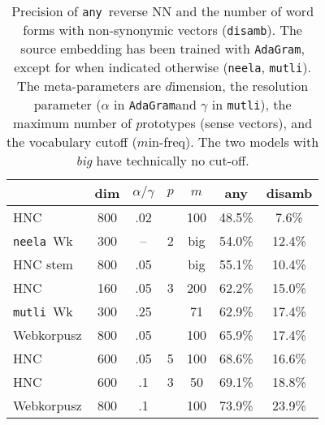 \documentclass[11pt]{article}
\newcommand{\neelakantan}{\texttt{neela}}
\newcommand{\adagram}{\texttt{AdaGram}}
\newcommand{\mutli}{\texttt{mutli}}
\newcommand{\any}{\texttt{any}}
\newcommand{\disamb}{\texttt{disamb}}
\begin{document}
\begin{table}
  \centering\small
    \begin{tabular}{lcccc|cc}
      \toprule
        & dim & $\alpha/\gamma$ & $p$ & $m$ & any & disamb \\
      \midrule
      HNC	        & 800	& .02	&       & 100   & 48.5\%	&  7.6\% \\
      \neelakantan~Wk&300&--&2   &big  & 54.0\%	&  12.4\% \\
      HNC stem & 800	& .05	&       &  big & 55.1\%	&  10.4\% \\
      HNC         & 160 & .05 & 3     & 200   & 62.2\%	&  15.0\% \\
      \mutli~Wk &300&.25 &       & 71    & 62.9\%	&  17.4\% \\
      Webkorpusz	    & 800	& .05	&       & 100	  & 65.9\%	&  17.4\% \\
      HNC	        & 600	& .05	& 5     & 100	  & 68.6\%	&  16.6\% \\
      HNC	        & 600	& .1  & 3     & 50	  & 69.1\%	&  18.8\% \\
      Webkorpusz	    & 800	& .1  &       & 100	  & 73.9\%	&  23.9\% \\
      \bottomrule
    \end{tabular}
  \caption{Precision of \any~reverse NN and the number of word forms with
  non-synonymic vectors (\disamb).  The source embedding has been trained with
  \adagram, except for when indicated otherwise (\neelakantan, \mutli).  The
  meta-parameters are $d$imension, the resolution parameter ($\alpha$ in
  \adagram and $\gamma$ in \mutli), the maximum number of $p$rototypes (sense
  vectors), and the vocabulary cutoff ($m$in-freq). The two models with
  \emph{big} have technically no cut-off.}
    \label{tab:prec}
\end{table}
\end{document}
